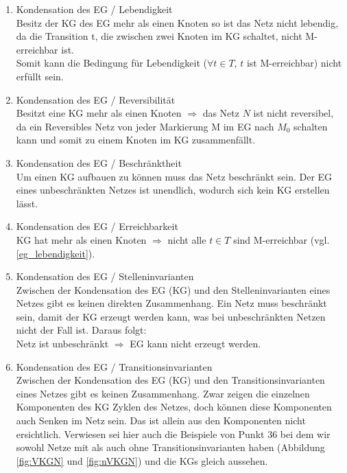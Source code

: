 \documentclass[10pt]{scrartcl}
\begin{document}
\begin{enumerate}
\item{Kondensation des EG / Lebendigkeit}\\
\label{eg_lebendigkeit}
Besitz der KG des EG mehr als einen Knoten so ist das Netz nicht lebendig, da die Transition t, die zwischen zwei Knoten im KG schaltet, nicht M-erreichbar ist.\\
Somit kann die Bedingung für Lebendigkeit ($\forall t \in T$, $t$ ist M-erreichbar) nicht erfüllt sein.

\item{Kondensation des EG  / Reversibilität}\\
Besitzt eine KG mehr als einen Knoten $\Rightarrow$ das Netz $N$ ist nicht reversibel, da ein Reversibles Netz von jeder Markierung M im EG nach $M_{0}$ schalten kann und somit zu einem Knoten im KG zusammenfällt. 

\item{Kondensation des EG  / Beschränktheit}\\
Um einen KG aufbauen zu können muss das Netz beschränkt sein. 
Der EG eines unbeschränkten Netzes ist unendlich, wodurch sich kein KG erstellen lässt. 

\item{Kondensation des EG  / Erreichbarkeit}\\
KG hat mehr als einen Knoten $\Rightarrow$ nicht alle $t \in T$ sind M-erreichbar (vgl. \ref{eg_lebendigkeit}).

\item{Kondensation des EG  / Stelleninvarianten}\\
Zwischen der Kondensation des EG (KG) und den Stelleninvarianten eines Netzes gibt es keinen direkten Zusammenhang. 
Ein Netz muss beschränkt sein, damit der KG erzeugt werden kann, was bei unbeschränkten Netzen nicht der Fall ist. Daraus folgt:\\
Netz ist unbeschränkt $\Rightarrow$ EG kann nicht erzeugt werden.

\item{Kondensation des EG  / Transitionsinvarianten}\\
Zwischen der Kondensation des EG (KG) und den Transitionsinvarianten eines Netzes gibt es keinen Zusammenhang. Zwar zeigen die einzelnen Komponenten des KG Zyklen des Netzes, doch können diese Komponenten auch Senken im Netz sein. Das ist allein aus den Komponenten nicht ersichtlich. Verwiesen sei hier auch die Beispiele von Punkt 36 bei dem wir sowohl Netze mit als auch ohne Transitionsinvarianten haben (Abbildung \ref{fig:VKGN} und \ref{fig:nVKGN}) und die KGs gleich aussehen.


\end{enumerate}
\end{document}
